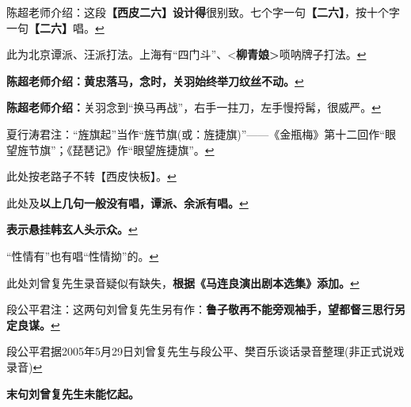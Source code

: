\item
  \leavevmode\hypertarget{fn176}{}%
  陈超老师介绍：这段\textbf{【西皮二六】设计得}很别致。七个字一句\textbf{【二六】}，按十个字一句\textbf{【二六】}唱。\protect\hyperlink{fnref176}{↩}
\item
  \leavevmode\hypertarget{fn177}{}%
  此为北京谭派、汪派打法。上海有``四门斗''、\textless{}\textbf{柳青娘\textgreater{}}唢呐牌子打法。\protect\hyperlink{fnref177}{↩}
\item
  \leavevmode\hypertarget{fn178}{}%
  \textbf{陈超老师介绍：黄忠落马，念时，关羽始终举刀纹丝不动。}\protect\hyperlink{fnref178}{↩}
\item
  \leavevmode\hypertarget{fn179}{}%
  \textbf{陈超老师介绍：}关羽念到``换马再战''，右手一拄刀，左手慢捋髯，很威严。\protect\hyperlink{fnref179}{↩}
\item
  \leavevmode\hypertarget{fn180}{}%
  夏行涛君注：``旌旗起''当作``旌节旗(或：旌捷旗)''------《金瓶梅》第十二回作``眼望旌节旗''；《琵琶记》作``眼望旌捷旗''。\protect\hyperlink{fnref180}{↩}
\item
  \leavevmode\hypertarget{fn181}{}%
  此处按老路子不转【西皮快板】。\protect\hyperlink{fnref181}{↩}
\item
  \leavevmode\hypertarget{fn182}{}%
  此处及\textbf{以上几句一般没有唱，谭派、余派有唱。}\protect\hyperlink{fnref182}{↩}
\item
  \leavevmode\hypertarget{fn183}{}%
  \textbf{表示悬挂韩玄人头示众。}\protect\hyperlink{fnref183}{↩}
\item
  \leavevmode\hypertarget{fn184}{}%
  ``性情有''也有唱``性情拗''的。\protect\hyperlink{fnref184}{↩}
\item
  \leavevmode\hypertarget{fn185}{}%
  此处刘曾复先生录音疑似有缺失，\textbf{根据《马连良演出剧本选集》添加。}\protect\hyperlink{fnref185}{↩}
\item
  \leavevmode\hypertarget{fn186}{}%
  段公平君注：这两句刘曾复先生另有作：\textbf{鲁子敬再不能旁观袖手，望都督三思行另定良谋。}\protect\hyperlink{fnref186}{↩}
\item
  \leavevmode\hypertarget{fn187}{}%
  段公平君据2005年5月29日刘曾复先生与段公平、樊百乐谈话录音整理(非正式说戏录音)\protect\hyperlink{fnref187}{↩}
\item
  \leavevmode\hypertarget{fn188}{}%
  \textbf{末句刘曾复先生未能忆起。}

